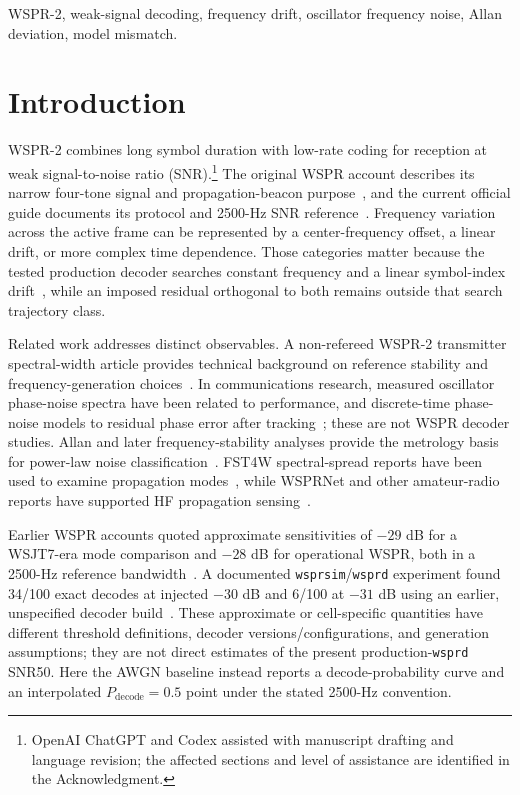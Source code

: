 \documentclass{ieeeaccess}
\begin{document}
\begin{keywords}
WSPR-2, weak-signal decoding, frequency drift, oscillator frequency noise, Allan deviation, model mismatch.
\end{keywords}

\titlepgskip=-21pt
\maketitle

\section{Introduction}
WSPR-2 combines long symbol duration with low-rate coding for reception at weak signal-to-noise ratio (SNR).\footnote{OpenAI ChatGPT and Codex assisted with manuscript drafting and language revision; the affected sections and level of assistance are identified in the Acknowledgment.} The original WSPR account describes its narrow four-tone signal and propagation-beacon purpose~\cite{taylor2010}, and the current official guide documents its protocol and 2500-Hz SNR reference~\cite{wsjtxguide}. Frequency variation across the active frame can be represented by a center-frequency offset, a linear drift, or more complex time dependence. Those categories matter because the tested production decoder searches constant frequency and a linear symbol-index drift~\cite{wsjtx302}, while an imposed residual orthogonal to both remains outside that search trajectory class.

Related work addresses distinct observables. A non-refereed WSPR-2 transmitter spectral-width article provides technical background on reference stability and frequency-generation choices~\cite{johnson2026}. In communications research, measured oscillator phase-noise spectra have been related to performance, and discrete-time phase-noise models to residual phase error after tracking~\cite{khanzadi2014,piemontese2024}; these are not WSPR decoder studies. Allan and later frequency-stability analyses provide the metrology basis for power-law noise classification~\cite{allan1966,riley2008,mcgee2007}. FST4W spectral-spread reports have been used to examine propagation modes~\cite{griffiths2023}, while WSPRNet and other amateur-radio reports have supported HF propagation sensing~\cite{frissell2019,frissell2022,mahmoudian2026}.

Earlier WSPR accounts quoted approximate sensitivities of $-29$ dB for a WSJT7-era mode comparison and $-28$ dB for operational WSPR, both in a 2500-Hz reference bandwidth~\cite{taylor2008wsjt7,taylor2010}. A documented \texttt{wsprsim}/\texttt{wsprd} experiment found 34/100 exact decodes at injected $-30$ dB and 6/100 at $-31$ dB using an earlier, unspecified decoder build~\cite{estevez2016}. These approximate or cell-specific quantities have different threshold definitions, decoder versions/configurations, and generation assumptions; they are not direct estimates of the present production-\texttt{wsprd} SNR50. Here the AWGN baseline instead reports a decode-probability curve and an interpolated $P_{\mathrm{decode}}=0.5$ point under the stated 2500-Hz convention.
\end{document}
